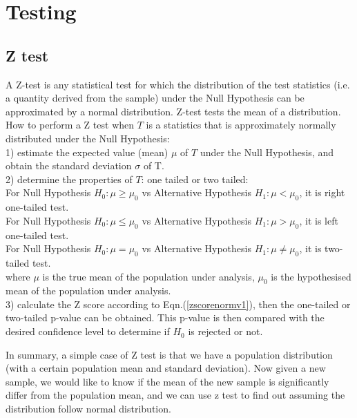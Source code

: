 \graphicspath{%
{chapter3graph/}%
{chapter3graph/bg/}}

\chapter{Testing}

\section{Z test}
\label{ztest}

A Z-test is any statistical test for which the distribution of the test statistics (i.e. a quantity derived from the sample) under the Null Hypothesis can be approximated by a normal distribution. Z-test tests the mean of a distribution. \\

How to perform a Z test when $T$ is a statistics that is approximately normally distributed under the Null Hypothesis:\\
1) estimate the expected value (mean) $\mu$ of $T$ under the Null Hypothesis, and obtain the standard deviation $\sigma$ of T.\\
2) determine the properties of $T$: one tailed or two tailed: \\
For Null Hypothesis $H_0: \mu \geq \mu_0$ vs Alternative Hypothesis $H_1: \mu < \mu_0$, it is right one-tailed test.\\ 
For Null Hypothesis $H_0: \mu \leq \mu_0$ vs Alternative Hypothesis $H_1: \mu > \mu_0$, it is left one-tailed test.\\ 
For Null Hypothesis $H_0: \mu = \mu_0$ vs Alternative Hypothesis $H_1: \mu \neq \mu_0$, it is two-tailed test.\\ 
where $\mu$ is the true mean of the population under analysis, $\mu_0$ is the hypothesised mean of the population under analysis. \\

3) calculate the Z score according to Eqn.(\ref{zscorenormv1}), then the one-tailed or two-tailed p-value can be obtained. This p-value is then compared with the desired confidence level to determine if $H_0$ is rejected or not.

In summary, a simple case of Z test is that we have a population distribution (with a certain population mean and standard deviation). Now given a new sample, we would like to know if the mean of the new sample is significantly differ from the population mean, and we can use z test to find out assuming the distribution follow normal distribution.\\

